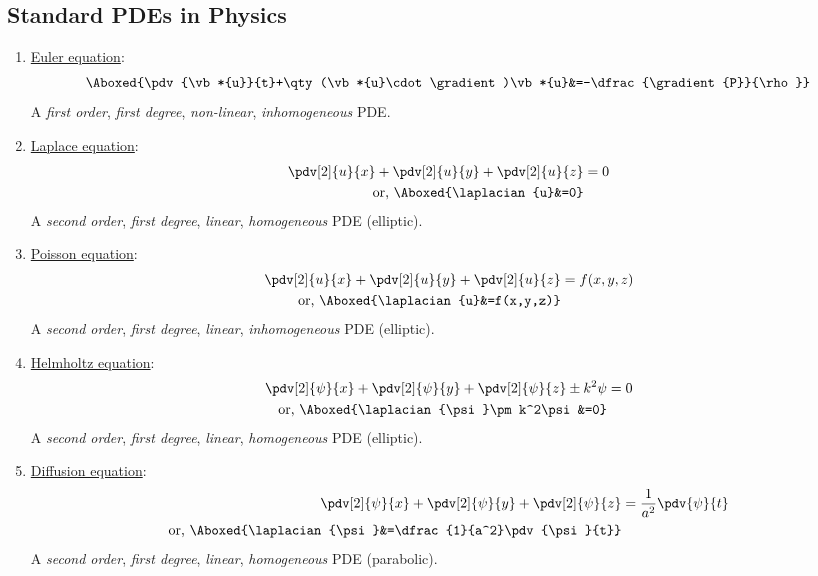     \subsection{Standard PDEs in Physics}
        \begin{enumerate}
            \item \ul{Euler equation}:
            \begin{align*}
                \Aboxed{\pdv{\vb*{u}}{t}+\qty(\vb*{u}\cdot\gradient)\vb*{u}&=-\dfrac{\gradient{P}}{\rho}}
            \end{align*}
            A \textit{first order}, \textit{first degree}, \textit{non-linear}, \textit{inhomogeneous} PDE.
            
            \item \ul{Laplace equation}:
            \begin{align*}
                \pdv[2]{u}{x}+\pdv[2]{u}{y}+\pdv[2]{u}{z}&=0 \\
                \text{or, }\Aboxed{\laplacian{u}&=0}
            \end{align*}
            A \textit{second order}, \textit{first degree}, \textit{linear}, \textit{homogeneous} PDE (elliptic).

            \item \ul{Poisson equation}:
            \begin{align*}
                \pdv[2]{u}{x}+\pdv[2]{u}{y}+\pdv[2]{u}{z}&=f(x,y,z) \\
                \text{or, }\Aboxed{\laplacian{u}&=f(x,y,z)}
            \end{align*}
            A \textit{second order}, \textit{first degree}, \textit{linear}, \textit{inhomogeneous} PDE (elliptic).

            \item \ul{Helmholtz equation}:
            \begin{align*}
                \pdv[2]{\psi}{x}+\pdv[2]{\psi}{y}+\pdv[2]{\psi}{z}\pm k^2\psi&=0 \\
                \text{or, }\Aboxed{\laplacian{\psi}\pm k^2\psi&=0}
            \end{align*}
            A \textit{second order}, \textit{first degree}, \textit{linear}, \textit{homogeneous} PDE (elliptic).

            \item \ul{Diffusion equation}:
            \begin{align*}
                \pdv[2]{\psi}{x}+\pdv[2]{\psi}{y}+\pdv[2]{\psi}{z}&=\dfrac{1}{a^2}\pdv{\psi}{t} \\
                \text{or, }\Aboxed{\laplacian{\psi}&=\dfrac{1}{a^2}\pdv{\psi}{t}}
            \end{align*}
            A \textit{second order}, \textit{first degree}, \textit{linear}, \textit{homogeneous} PDE (parabolic).


\end{enumerate}
